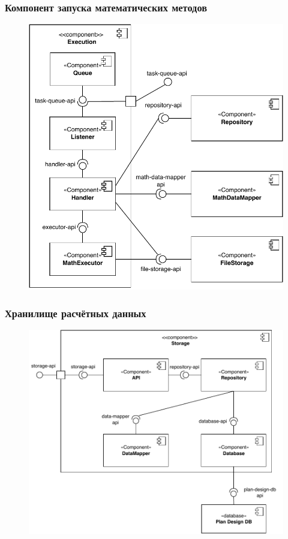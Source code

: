 \begin{frame}
\frametitle{Компонент запуска математических методов}
\begin{figure}
    \includegraphics[scale=.5]{pictures/architecture/executor_component_detailed}
\end{figure}
\end{frame}


\begin{frame}
\frametitle{Хранилище расчётных данных}
\begin{figure}
    \includegraphics[scale=.55]{pictures/architecture/storage_component_common}
\end{figure}
\end{frame}


